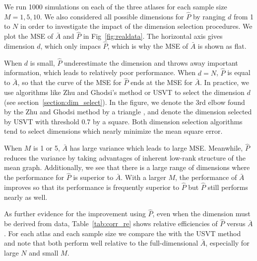 \documentclass[10pt,letterpaper]{article}
\begin{document}
We run 1000 simulations on each of the three atlases for each sample size $M=1,5,10$.
We also considered all possible dimensions for $\hat{P}$ by ranging $d$ from 1 to $N$ in order to investigate the impact of the dimension selection procedures.
We plot the MSE of $\bar{A}$ and $\hat{P}$ in Fig~\ref{fig:realdata}.
The horizontal axis gives dimension $d$, which only impacs $\hat{P}$, which is why the MSE of $\bar{A}$ is shown as flat.

When $d$ is small, $\hat{P}$ underestimate the dimension and throws away important information, which leads to relatively poor performance. When $d=N$, $\hat{P}$ is equal to $\bar{A}$, so that the curve of the MSE for $\hat{P}$ ends at the MSE for $\bar{A}$. 
In practice, we use algorithms like Zhu and Ghodsi's method or USVT to select the dimension $d$ (see section~\ref{section:dim_select}). 
In the figure, we denote the 3rd elbow found by the Zhu and Ghodsi method by a triangle , and denote the dimension selected by USVT with threshold 0.7 by a square. 
Both dimension selection algorithms tend to select dimensions which nearly minimize the mean square error.

When $M$ is 1 or 5, $\bar{A}$ has large variance which leads to large MSE. Meanwhile, $\hat{P}$ reduces the variance by taking advantages of inherent low-rank structure of the mean graph. Additionally, we see that there is a large range of dimensions where the performance for $\hat{P}$ is superior to $\bar{A}$. 
With a larger $M$, the performance of $\bar{A}$ improves so that its performance is frequently superior to $\hat{P}$ but $\hat{P}$ still performs nearly as well.

As further evidence for the improvement using $\hat{P}$, even when the dimension must be derived from data, Table~\ref{tab:corr_re} shows relative efficiencies of $\hat{P}$ versus $\bar{A}$.
For each atlas and each sample size we compare the \citet{zhu2006automatic} with the USVT method and note that both perform well relative to the full-dimensional $\bar{A}$, especially for large $N$ and small $M$.
\end{document}
